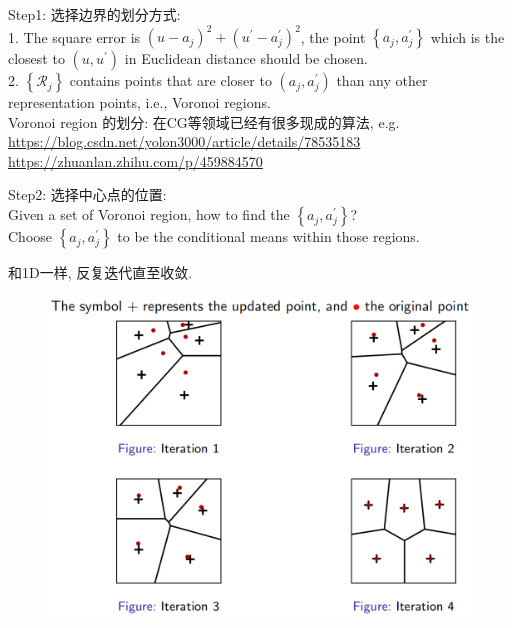 Step1: 选择边界的划分方式: \\
1. The square error is $\left(u-a_j\right)^2+\left(u^{\prime}-a_j^{\prime}\right)^2$, the point $\left\{a_j, a_j^{\prime}\right\}$ which is the closest to $\left(u, u^{\prime}\right)$ in Euclidean distance should be chosen. \\
2. $\left\{\mathcal{R}_j\right\}$ contains points that are closer to $\left(a_j, a_j^{\prime}\right)$ than any other representation points, i.e., Voronoi regions. \\
Voronoi region 的划分: 在CG等领域已经有很多现成的算法, e.g.
\href{https://blog.csdn.net/yolon3000/article/details/78535183}{https://blog.csdn.net/yolon3000/article/details/78535183} \\
\href{https://zhuanlan.zhihu.com/p/459884570}{https://zhuanlan.zhihu.com/p/459884570}

Step2: 选择中心点的位置: \\
Given a set of Voronoi region, how to find the $\left\{a_j, a_j^{\prime}\right\}$? \\
Choose $\left\{a_j, a_j^{\prime}\right\}$ to be the conditional means within those regions.

和1D一样, 反复迭代直至收敛.
\begin{figure}[htbp]
    \centering
    \includegraphics[width=\textwidth]{./figures/chapter8/2D_quantization_iter.png}
\end{figure}